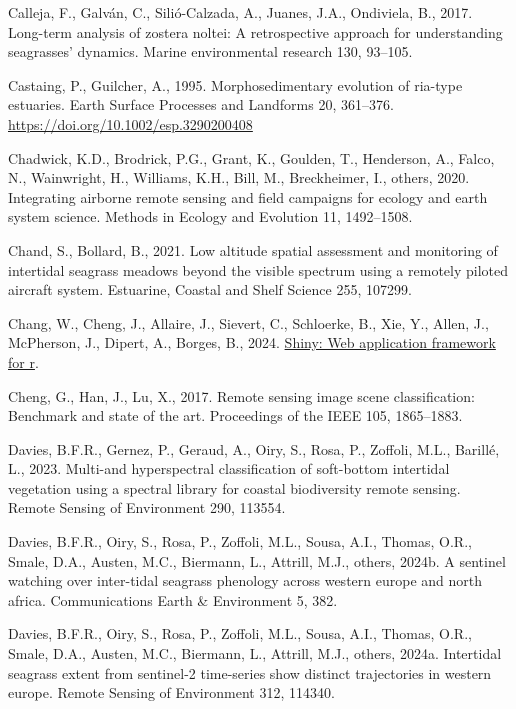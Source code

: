 \documentclass[
  letterpaper,
  DIV=11,
  numbers=noendperiod]{scrartcl}
\newlength{\cslhangindent}
\newenvironment{CSLReferences}[2] %
 {\begin{list}{}{%
  \setlength{\itemindent}{0pt}
  \setlength{\leftmargin}{0pt}
  \setlength{\parsep}{0pt}
  \ifodd #1
   \setlength{\leftmargin}{\cslhangindent}
   \setlength{\itemindent}{-1\cslhangindent}
  \fi
  \setlength{\itemsep}{#2\baselineskip}}}
 {\end{list}}
\begin{document}
\begin{CSLReferences}{1}{0}
Calleja, F., Galván, C., Silió-Calzada, A., Juanes, J.A., Ondiviela, B.,
2017. Long-term analysis of zostera noltei: A retrospective approach for
understanding seagrasses' dynamics. Marine environmental research 130,
93--105.

Castaing, P., Guilcher, A., 1995. Morphosedimentary evolution of
ria-type estuaries. Earth Surface Processes and Landforms 20, 361--376.
\url{https://doi.org/10.1002/esp.3290200408}

Chadwick, K.D., Brodrick, P.G., Grant, K., Goulden, T., Henderson, A.,
Falco, N., Wainwright, H., Williams, K.H., Bill, M., Breckheimer, I.,
others, 2020. Integrating airborne remote sensing and field campaigns
for ecology and earth system science. Methods in Ecology and Evolution
11, 1492--1508.

Chand, S., Bollard, B., 2021. Low altitude spatial assessment and
monitoring of intertidal seagrass meadows beyond the visible spectrum
using a remotely piloted aircraft system. Estuarine, Coastal and Shelf
Science 255, 107299.

Chang, W., Cheng, J., Allaire, J., Sievert, C., Schloerke, B., Xie, Y.,
Allen, J., McPherson, J., Dipert, A., Borges, B., 2024.
\href{https://CRAN.R-project.org/package=shiny}{Shiny: Web application
framework for r}.

Cheng, G., Han, J., Lu, X., 2017. Remote sensing image scene
classification: Benchmark and state of the art. Proceedings of the IEEE
105, 1865--1883.

Davies, B.F.R., Gernez, P., Geraud, A., Oiry, S., Rosa, P., Zoffoli,
M.L., Barillé, L., 2023. Multi-and hyperspectral classification of
soft-bottom intertidal vegetation using a spectral library for coastal
biodiversity remote sensing. Remote Sensing of Environment 290, 113554.

Davies, B.F.R., Oiry, S., Rosa, P., Zoffoli, M.L., Sousa, A.I., Thomas,
O.R., Smale, D.A., Austen, M.C., Biermann, L., Attrill, M.J., others,
2024b. A sentinel watching over inter-tidal seagrass phenology across
western europe and north africa. Communications Earth \& Environment 5,
382.

Davies, B.F.R., Oiry, S., Rosa, P., Zoffoli, M.L., Sousa, A.I., Thomas,
O.R., Smale, D.A., Austen, M.C., Biermann, L., Attrill, M.J., others,
2024a. Intertidal seagrass extent from sentinel-2 time-series show
distinct trajectories in western europe. Remote Sensing of Environment
312, 114340.


\end{CSLReferences}
\end{document}
